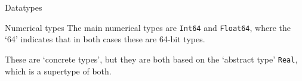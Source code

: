 \begin{comment}
\begin{exercise}
  \label{q:initvar}
  \begin{lstlisting}
    #include <iostream>
    using std::cout;
    using std::endl;
    int main() {
      int i;
      int j = i+1;
      cout << j << endl;
      return 0;
    }
  \end{lstlisting}
  What happens?
  \begin{enumerate}
  \item Compiler error
  \item Output: \lstinline{1}
  \item Output is undefined
  \item Error message during running the program.
  \end{enumerate}
\end{exercise}

\begin{block}{Terminal input}
  \label{sl:cin}
  To make a program run dynamic, you can set starting values from
  keyboard input. For this, use \indextermtt{cin}, which takes
  keyboard input and puts it in a numerical (or string) variable.
  \begin{lstlisting}
    // add at the top of your program:
    using std::cin;

    // then in your main:
    int i;
    cin >> i;
  \end{lstlisting}
\end{block}
\end{comment}

 {Datatypes}
\label{sec:jtypes}

\begin{block}{Numerical types}
  The main numerical types are \lstinline{Int64} and \lstinline{Float64},
  where the `64' indicates that in both cases these are 64-bit types.

  These are `concrete types', but they are both based on the `abstract
  type' \lstinline{Real}, which is a supertype of both.
\end{block}

